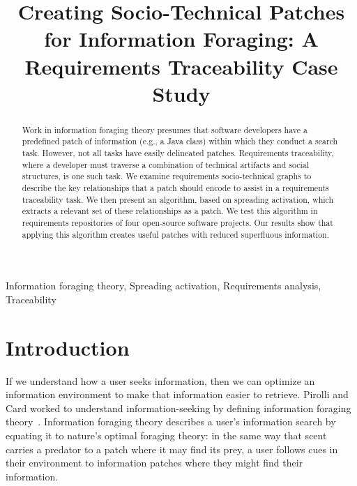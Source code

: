 \documentclass[conference]{IEEEtran}
\begin{document}
\title{Creating Socio-Technical Patches for Information Foraging: A Requirements Traceability Case Study}

\author{}

%
%


\maketitle

\begin{abstract}
Work in information foraging theory presumes that software developers have a predefined patch of information (e.g., a Java class) within which they conduct a search task. However, not all tasks have easily delineated patches. Requirements traceability, where a developer must traverse a combination of technical artifacts and social structures, is one such task. We examine requirements socio-technical graphs to describe the key relationships that a patch should encode to assist in a requirements traceability task. We then present an algorithm, based on spreading activation, which extracts a relevant set of these relationships as a patch. We test this algorithm in requirements repositories of four open-source software projects. Our results show that applying this algorithm creates useful patches with reduced superfluous information.
\end{abstract}

\begin{IEEEkeywords}
Information foraging theory, Spreading activation, Requirements analysis, Traceability
\end{IEEEkeywords}

\section{Introduction}
If we understand how a user seeks information, then we can optimize an information environment to make that information easier to retrieve. Pirolli and Card worked to understand information-seeking by defining information foraging theory~\cite{ift}.
Information foraging theory describes a user's information search by equating it to nature's optimal foraging theory: in the same way that scent carries a predator to a patch where it may find its prey, a user follows cues in their environment to information patches where they might find their information.
\end{document}
